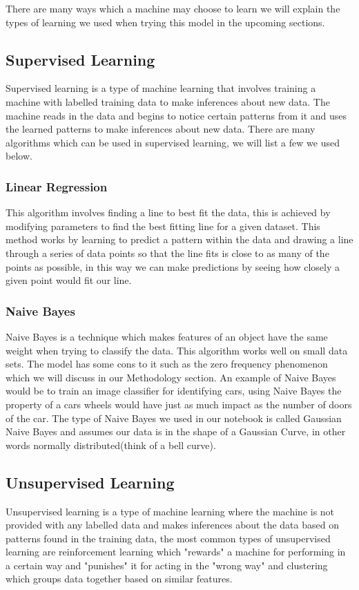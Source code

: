 \documentclass[conference]{IEEEtran}
\begin{document}
There are many ways which a machine may choose to learn we will explain the types of learning we used when trying this model in the upcoming sections.

\subsection{Supervised Learning}
Supervised learning is a type of machine learning that involves training a machine with labelled training data to make inferences about new data.  The machine reads in the data and begins to notice certain patterns from it and uses the learned patterns to make inferences about new data.  There are many algorithms which can be used in supervised learning, we will list a few we used below.  
\vspace{2mm}
\subsubsection{Linear Regression}
This algorithm involves finding a line to best fit the data, this is achieved by modifying parameters to find the best fitting line for a given dataset. This method works by learning to predict a pattern within the data and drawing a line through a series of data points so that the line fits is close to as many of the points as possible, in this way we can make predictions by seeing how closely a given point would fit our line.  
\vspace{2mm}
\subsubsection{Naive Bayes}
Naive Bayes is a technique which makes features of an object have the same weight when trying to classify the data.  This algorithm works well on small data sets.  The model has some cons to it such as the zero frequency phenomenon which we will discuss in our Methodology section.  An example of Naive Bayes would be to train an image classifier for identifying cars, using Naive Bayes the property of a cars wheels would have just as much impact as the number of doors of the car.  The type of Naive Bayes we used in our notebook is called Gaussian Naive Bayes and assumes our data is in the shape of a Gaussian Curve, in other words normally distributed(think of a bell curve).
\subsection{Unsupervised Learning}
Unsupervised learning is a type of machine learning where the machine is not provided with any labelled data and makes inferences about the data based on patterns found in the training data, the most common types of unsupervised learning are reinforcement learning which "rewards" a machine for performing in a certain way and "punishes" it for acting in the "wrong way" and clustering which groups data together based on similar features.
\end{document}
